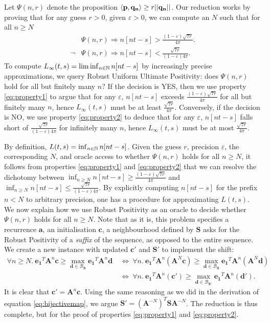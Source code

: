 Let $\Psi(n, r)$ denote the proposition $ \langle\mathbf{p}, \mathbf{q_n}\rangle \ge r||\mathbf{q_n}||$. Our reduction works by proving that for any guess $r>0$, given $\varepsilon>0$, we can compute an $N$ such that for all $n \ge N$
\begin{align}
\label{eq:property1}
&\Psi(n, r) \Rightarrow n[nt - s] > \frac{(1-\varepsilon)\sqrt{7r}}{4\pi}. \\
\label{eq:property2}
\neg &\Psi(n, r) \Rightarrow n[nt - s] < \frac{\sqrt{7r}}{(1-\varepsilon)4\pi}.
\end{align}
To compute $L_\infty(t, s) = \liminf_{n \in \mathbb{N}} n[nt-s]$ by increasingly precise approximations, we query Robust Uniform Ultimate Positivity: does $\Psi(n,r)$ hold for all but finitely many $n$? If the decision is YES, then we use property \ref{eq:property1} to argue that for any $\varepsilon$, $n[nt-s]$ exceeds $\frac{(1-\varepsilon)\sqrt{7r}}{4\pi}$ for all but finitely many $n$, hence $L_\infty(t, s)$ must be at least $\frac{\sqrt{7r}}{4\pi}$. Conversely, if the decision is NO, we use property \ref{eq:property2} to deduce that for any $\varepsilon$, $n[nt-s]$ falls short of $\frac{\sqrt{7r}}{(1-\varepsilon)4\pi}$ for infinitely many $n$, hence $L_\infty(t, s)$ must be at most $\frac{\sqrt{7r}}{4\pi}$.

By definition, $L(t,s) = \inf_{n\in\mathbb{N}}n[nt-s]$. Given the guess $r$, precision $\varepsilon$, the corresponding $N$, and oracle access to whether $\Psi(n, r)$ holds for all $n \ge N$, it follows from properties \ref{eq:property1} and \ref{eq:property2} that we can resolve the dichotomy between $\inf_{n \ge N}n[nt-s] \ge \frac{(1-\varepsilon)\sqrt{7r}}{4\pi}$ and $\inf_{n \ge N}n[nt-s] \le \frac{\sqrt{7r}}{(1-\varepsilon)4\pi}$. By explicitly computing $n[nt-s]$ for the prefix $n < N$ to arbitrary precision, one has a procedure for approximating $L(t, s)$. We now explain how we use Robust Positivity as an oracle to decide whether $\Psi(n, r)$ holds for all $n \ge N$. Note that as it is, this problem specifies a recurrence $\mathbf{a}$, an initialisation $\mathbf{c}$, a neighbourhood defined by $\mathbf{S}$ asks for the Robust Positivity of a \textit{suffix} of the sequence, as opposed to the entire sequence. We create a new instance with updated $\mathbf{c'}$ and $\mathbf{S'}$ to implement the shift:
\begin{align}
\forall n\ge N.~ \mathbf{e_1}^T\mathbf{A}^n\mathbf{c} \ge \max_{\mathbf{d} \in \mathcal{B}_\mathbf{S}}\mathbf{e_1}^T\mathbf{A}^n\mathbf{d} ~&\Leftrightarrow~ \forall n.~ \mathbf{e_1}^T\mathbf{A}^n(\mathbf{A}^N\mathbf{c}) \ge \max_{\mathbf{d} \in \mathcal{B}_\mathbf{S}}\mathbf{e_1}^T\mathbf{A}^n(\mathbf{A}^N\mathbf{d}) \\
&\Leftrightarrow~ \forall n.~ \mathbf{e_1}^T\mathbf{A}^n(\mathbf{c'}) \ge \max_{\mathbf{d} \in \mathcal{B}_\mathbf{S'}}\mathbf{e_1}^T\mathbf{A}^n(\mathbf{d'}).
\end{align}
It is clear that $\mathbf{c'} = \mathbf{A}^n\mathbf{c}$. Using the same reasoning as we did in the derivation of equation \ref{eq:bijectivemap}, we argue $\mathbf{S'} = (\mathbf{A}^{-N})^T\mathbf{S}\mathbf{A}^{-N}$. The reduction is thus complete, but for the proof of properties \ref{eq:property1} and \ref{eq:property2}.

